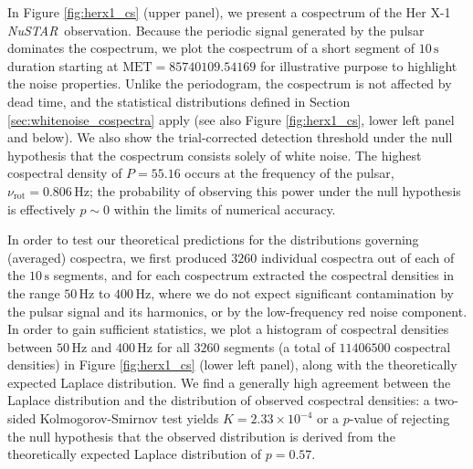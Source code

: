 \documentclass[12pt]{emulateapj}
\newcommand{\project}[1]{\textsl{#1}}
\newcommand{\nustar}{\project{NuSTAR}\xspace}
\begin{document}
\begin{bf}
In Figure \ref{fig:herx1_cs} (upper panel), we present a cospectrum of the Her X-1 \nustar\ observation. Because the periodic signal generated by the pulsar dominates the cospectrum, we plot the cospectrum of a short segment of $10\,\mathrm{s}$ duration starting at $\mathrm{MET} = 85740109.54169$ for illustrative purpose to highlight the noise properties. Unlike the periodogram, the cospectrum is not affected by dead time, and the statistical distributions defined in Section \ref{sec:whitenoise_cospectra} apply (see also Figure \ref{fig:herx1_cs}, lower left panel and below). We also show the trial-corrected detection threshold under the null hypothesis that the cospectrum consists solely of white noise. The highest cospectral density of $P = 55.16$ occurs at the frequency of the pulsar, $\nu_\mathrm{rot} = 0.806\,\mathrm{Hz}$; the probability of observing this power under the null hypothesis is effectively $p \sim 0$ within the limits of numerical accuracy. 

In order to test our theoretical predictions for the distributions governing (averaged) cospectra, we first produced $3260$ individual cospectra out of each of the $10\,\mathrm{s}$ segments, and for each cospectrum extracted the cospectral densities in the range $50\,\mathrm{Hz}$ to $400\,\mathrm{Hz}$, where we do not expect significant contamination by the pulsar signal and its harmonics, or by the low-frequency red noise component.  In order to gain sufficient statistics, we plot a histogram of cospectral densities between $50\,\mathrm{Hz}$ and $400\,\mathrm{Hz}$ for all $3260$ segments (a total of $11406500$ cospectral densities) in Figure \ref{fig:herx1_cs} (lower left panel), along with the theoretically expected Laplace distribution. We find a generally high agreement between the Laplace distribution and the distribution of observed cospectral densities: a two-sided Kolmogorov-Smirnov test yields $K= 2.33 \times 10^{-4}$ or a $p$-value of rejecting the null hypothesis that the observed distribution is derived from the theoretically expected Laplace distribution of $p = 0.57$. 


\end{bf}
\end{document}
